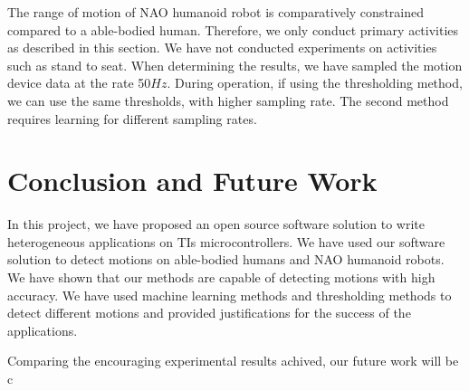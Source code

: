 \documentclass[letterpaper]{article}
\begin{document}
The range of motion of NAO humanoid robot is comparatively constrained compared to a able-bodied 
human. Therefore, we only conduct primary activities as described in this section. We have not 
conducted experiments on activities such as stand to seat. When determining the results, we 
have sampled the motion device data at the rate 50$Hz$. During operation, if using the 
thresholding method, we can use the same thresholds, with higher sampling rate. The second method 
requires learning for different sampling rates. 


\section{Conclusion and Future Work}

In this project, we have proposed an open source software solution to write heterogeneous
applications on TIs microcontrollers. We have used our software solution to detect motions on
able-bodied humans and NAO humanoid robots. We have shown that our methods are capable of detecting
motions with high accuracy. We have used machine learning methods and thresholding methods to
detect different motions and provided justifications for the success of the applications. 

\par
Comparing the encouraging experimental results achived, our future work will be c



\end{document}
